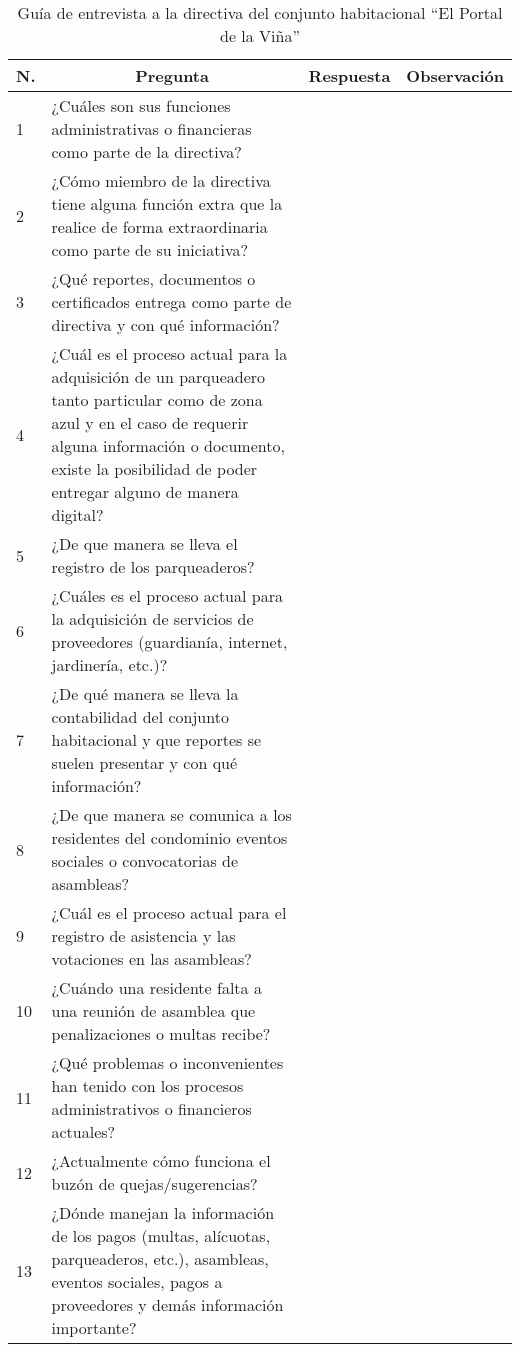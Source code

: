 \label{app:guia-entrevista-directiva}
\begin{table}[H]
	\caption{Guía de entrevista a la directiva del conjunto habitacional {\textquotedblleft}El Portal de la Viña{\textquotedblright}}
	\label{tab:guia-entrevista-directiva}
	\begin{small}

	\begin{center}
		\begin{tabular}[c]{p{} p{} p{} p{}}
			\hline
			\multicolumn{1}{c}{\textbf{N.}} & \multicolumn{1}{c}{\textbf{Pregunta}} & \multicolumn{1}{c}{\textbf{Respuesta}} & \multicolumn{1}{c}{\textbf{Observación}} \\
			\hline
			1 & ¿Cuáles son sus funciones administrativas o financieras como parte de la directiva?  \\
			2 & ¿Cómo miembro de la directiva tiene alguna función extra que la realice de forma extraordinaria como parte de su iniciativa?\\
			3 & ¿Qué reportes, documentos o certificados entrega como parte de directiva y con qué información?\\
			4 & ¿Cuál es el proceso actual para la adquisición de un parqueadero tanto particular como de zona azul y en el caso de requerir alguna información o documento, existe la posibilidad de poder entregar alguno de manera digital?\\
			5 & ¿De que manera se lleva el registro de los parqueaderos?\\
			6 & ¿Cuáles es el proceso actual para la adquisición de servicios de proveedores (guardianía, internet, jardinería, etc.)?\\
			7 & ¿De qué manera se lleva la contabilidad del conjunto habitacional y que reportes se suelen presentar y con qué información?\\
			8 & ¿De que manera se comunica a los residentes del condominio eventos sociales o convocatorias de asambleas?\\
			9 & ¿Cuál es el proceso actual para el registro de asistencia y las votaciones en las asambleas?\\
			10 & ¿Cuándo una residente falta a una reunión de asamblea que penalizaciones o multas recibe?\\
			11 & ¿Qué problemas o inconvenientes han tenido con los procesos administrativos o financieros actuales?\\
			12 & ¿Actualmente cómo funciona el buzón de quejas/sugerencias?\\
			13 & ¿Dónde manejan la información de los pagos (multas, alícuotas, parqueaderos, etc.), asambleas, eventos sociales, pagos a proveedores y demás información importante?\\
			\hline
		\end{tabular}
	\end{center}
	\end{small}
\end{table}
